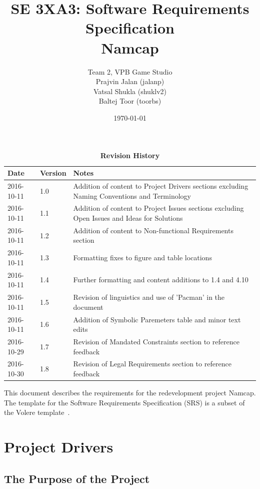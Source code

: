 \documentclass[12pt, titlepage]{article}
\title{SE 3XA3: Software Requirements Specification\\Namcap}
\author{Team 2, VPB Game Studio
		\\ Prajvin Jalan (jalanp)
		\\ Vatsal Shukla (shuklv2)
		\\ Baltej Toor (toorbs)
}
\date{\today}
\begin{document}
\maketitle

\tableofcontents
\listoftables
\listoffigures

\newpage

\begin{table}[H]
\caption{\bf Revision History}
\begin{tabularx}{\textwidth}{p{3cm}p{2cm}X}
\toprule {\bf Date} & {\bf Version} & {\bf Notes}\\
\midrule
2016-10-11 & 1.0 & Addition of content to Project Drivers sections excluding Naming Conventions and Terminology\\
2016-10-11 & 1.1 & Addition of content to Project Issues sections excluding Open Issues and Ideas for Solutions\\
2016-10-11 & 1.2 & Addition of content to Non-functional Requirements section\\
2016-10-11 & 1.3 & Formatting fixes to figure and table locations\\
2016-10-11 & 1.4 & Further formatting and content additions to 1.4 and 4.10\\
2016-10-11 & 1.5 & Revision of linguistics and use of 'Pacman' in the document\\
2016-10-11 & 1.6 & Addition of Symbolic Paremeters table and minor text edits\\
2016-10-29 & 1.7 & Revision of Mandated Constraints section to reference feedback\\
2016-10-30 & 1.8 & Revision of Legal Requirements section to reference feedback\\
\bottomrule
\end{tabularx}
\end{table}

\newpage


This document describes the requirements for the redevelopment project Namcap.  The template for the Software
Requirements Specification (SRS) is a subset of the Volere
template~\citep{RobertsonAndRobertson2012}.

\section{Project Drivers}

\subsection{The Purpose of the Project}
\end{document}
